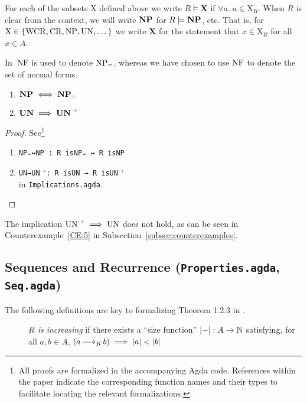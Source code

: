 \begin{notation}
    For each of the subsets $\mathrm{X}$ defined above we write 
    $R \models \mathbf{X}$ if $\forall a.\; a \in \mathrm{X}_R$. When $R$ is clear from the context, we will write $\mathbf{NP}$ for $R \models \mathbf{NP}$, etc.
    That is, for $\mathrm{X} \in \{\mathrm{WCR} , \mathrm{CR} , \mathrm{NP} , \mathrm{UN}, \dots \}$ we write $\mathbf{X}$ for the statement that $x \in \mathrm{X}_R$ for all $x \in A$.
\end{notation}


In \terese $\,\mathrm{NF}$ is used to denote $\mathrm{NP_=}$, whereas we have chosen to use $\mathrm{NF}$ to denote the set of normal forms.

\begin{proposition}\hfill
    \begin{enumerate}
        \item $\mathbf{NP} \iff \mathbf{NP_=}$
        \item $\mathbf{UN} \implies \mathbf{UN}^{\to}$
    \end{enumerate}
\end{proposition}
\begin{proof} See\footnote{All proofs are formalized in the accompanying Agda code. References within the paper indicate the corresponding function names and their types to facilitate locating the relevant formalizations.} \hfill
    \begin{enumerate}
        \item \verb|NP₌↔NP : R isNP₌ ↔ R isNP| 
        \item \verb|UN→|\texttt{UN}$^{\to}$\verb|: R isUN → R is|\texttt{UN}$^{\to}$ \\ in \texttt{Implications.agda}.
    \end{enumerate}
\end{proof}

\begin{remark}
    The implication $\mathrm{UN}^{\to} \implies \mathrm{UN}$ does not hold, as can be seen in Counterexample~\ref{CE:5} in Subsection~\ref{subsec:counterexamples}.
\end{remark}

\subsection{Sequences and Recurrence (\texttt{Properties.agda}, \texttt{Seq.agda})}
The following definitions are key to formalizing Theorem 1.2.3 in \terese.


\begin{definition} \hfill
    \begin{description}
        \item[] \emph{$R$ is increasing} if there exists a ``size function'' $|{-}| : A \to \mathbb{N}$ satisfying, for all $a, b \in A$,
        $(a \mathbin{\longrightarrow_R} b) \implies |a| < |b|$
    \end{description}
\end{definition}

